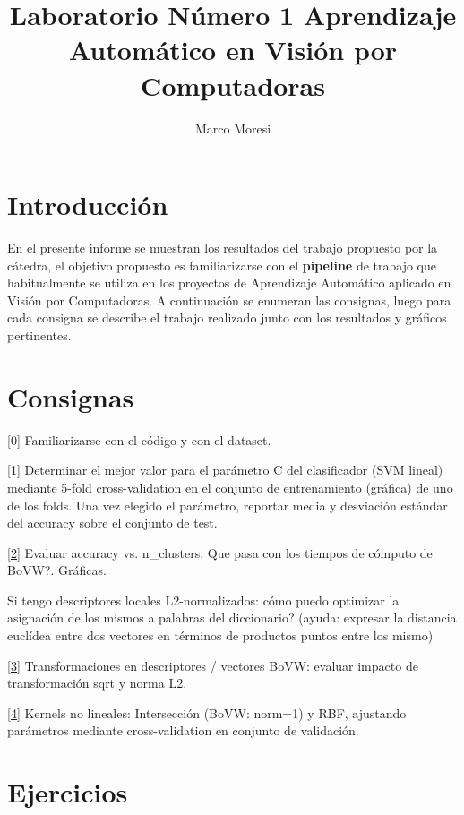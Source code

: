 \documentclass[11pt, spanish, a4paper]{article}
\author{Marco Moresi}
\begin{document}
\title{Laboratorio Número 1 Aprendizaje Automático en Visión por Computadoras}
\maketitle

\tableofcontents

\section{Introducción}
En el presente informe se muestran los resultados del trabajo propuesto por la cátedra, el objetivo propuesto es familiarizarse con el \textbf{pipeline} de trabajo que habitualmente se utiliza en los proyectos de Aprendizaje Automático aplicado en Visión por Computadoras.
A continuación se enumeran las consignas, luego para cada consigna se describe el trabajo realizado junto con los resultados y gráficos pertinentes.

\section{Consignas}

[0] Familiarizarse con el código y con el dataset.

\hyperref[ejercicio1]{[1]} Determinar el mejor valor para el parámetro C del clasificador (SVM lineal)
mediante 5-fold cross-validation en el conjunto de entrenamiento (gráfica) de
uno de los folds. Una vez elegido el parámetro, reportar media y desviación
estándar del accuracy sobre el conjunto de test.

\hyperref[ejercicio2]{[2]} Evaluar accuracy vs. n\_clusters. Que pasa con los tiempos de cómputo de
BoVW?. Gráficas.

Si tengo descriptores locales L2-normalizados: cómo puedo optimizar la
asignación de los mismos a palabras del diccionario? (ayuda: expresar la
distancia euclídea entre dos vectores en términos de productos puntos entre los
mismo)

\hyperref[ejercicio3]{[3]} Transformaciones en descriptores / vectores BoVW: evaluar impacto de
transformación sqrt y norma L2.


\hyperref[ejercicio4]{[4]} Kernels no lineales: Intersección (BoVW: norm=1) y RBF, ajustando parámetros
mediante cross-validation en conjunto de validación.



\section{Ejercicios}
\end{document}
